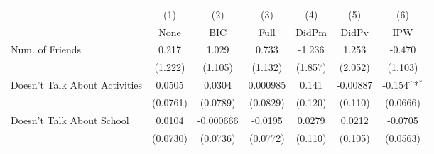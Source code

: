 {
\def\sym#1{\ifmmode^{#1}\else\(^{#1}\)\fi}
\begin{tabular}{l*{6}{c}}
\toprule
            &\multicolumn{1}{c}{(1)}&\multicolumn{1}{c}{(2)}&\multicolumn{1}{c}{(3)}&\multicolumn{1}{c}{(4)}&\multicolumn{1}{c}{(5)}&\multicolumn{1}{c}{(6)}\\
            &\multicolumn{1}{c}{None}&\multicolumn{1}{c}{BIC}&\multicolumn{1}{c}{Full}&\multicolumn{1}{c}{DidPm}&\multicolumn{1}{c}{DidPv}&\multicolumn{1}{c}{IPW}\\
\midrule
Num. of Friends&       0.217         &       1.029         &       0.733         &      -1.236         &       1.253         &      -0.470         \\
            &     (1.222)         &     (1.105)         &     (1.132)         &     (1.857)         &     (2.052)         &     (1.103)         \\
\addlinespace
Doesn't Talk About Activities&      0.0505         &      0.0304         &    0.000985         &       0.141         &    -0.00887         &      -0.154\sym{*}  \\
            &    (0.0761)         &    (0.0789)         &    (0.0829)         &     (0.120)         &     (0.110)         &    (0.0666)         \\
\addlinespace
Doesn't Talk About School&      0.0104         &   -0.000666         &     -0.0195         &      0.0279         &      0.0212         &     -0.0705         \\
            &    (0.0730)         &    (0.0736)         &    (0.0772)         &     (0.110)         &     (0.105)         &    (0.0563)         \\
\bottomrule
\end{tabular}
}
